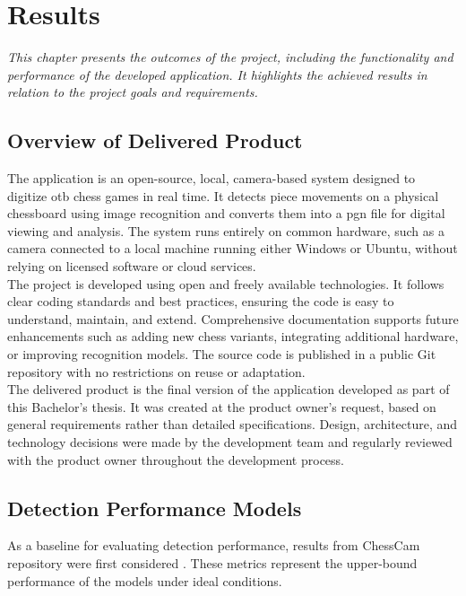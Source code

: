\chapter{Results}

\begin{center}
    \textit{This chapter presents the outcomes of the project, including the functionality and performance of the developed application. It highlights the achieved results in relation to the project goals and requirements.}
\end{center}

\section{Overview of Delivered Product}
The application is an open-source, local, camera-based system designed to digitize \gls{otb} chess games in real time. It detects piece movements on a physical chessboard using image recognition and converts them into a \gls{pgn} file for digital viewing and analysis. The system runs entirely on common hardware,  such as a camera connected to a local machine running either Windows or Ubuntu, without relying on licensed software or cloud services. \\

The project is developed using open and freely available technologies. It follows clear coding standards and best practices, ensuring the code is easy to understand, maintain, and extend. Comprehensive documentation supports future enhancements such as adding new chess variants, integrating additional hardware, or improving recognition models. The source code is published in a public Git repository with no restrictions on reuse or adaptation. \\

The delivered product is the final version of the application developed as part of this Bachelor’s thesis. It was created at the product owner's request, based on general requirements rather than detailed specifications. Design, architecture, and technology decisions were made by the development team and regularly reviewed with the product owner throughout the development process.

\section{Detection Performance Models}
\label{chesscam-metrics}
As a baseline for evaluating detection performance, results from ChessCam repository were first considered \cite{github:chesscam}. These metrics represent the upper-bound performance of the models under ideal conditions. \\

